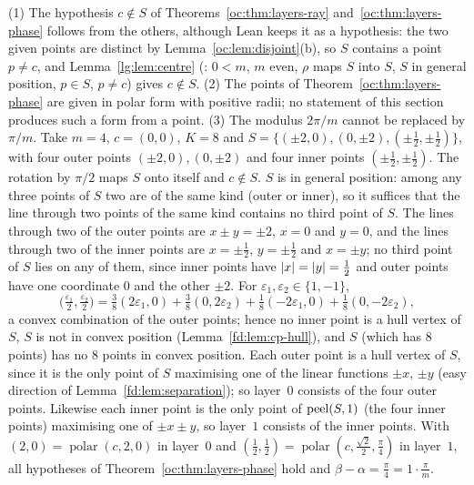 \begin{remark}\label{oc:rem:layers}
(1) The hypothesis $c\notin S$ of Theorems~\ref{oc:thm:layers-ray} and~\ref{oc:thm:layers-phase} follows
from the others, although Lean keeps it as a hypothesis: the two given points are distinct by
Lemma~\ref{oc:lem:disjoint}(b), so $S$ contains a point $p\ne c$, and Lemma~\ref{lg:lem:centre}
(: $0<m$, $m$ even, $\rho$ maps $S$ into $S$, $S$ in general position,
$p\in S$, $p\ne c$) gives $c\notin S$.
(2) The points of Theorem~\ref{oc:thm:layers-phase} are given in polar form with positive radii; no
statement of this section produces such a form from a point.
(3) The modulus $2\pi/m$ cannot be replaced by $\pi/m$. Take $m=4$, $c=(0,0)$, $K=8$ and
$S=\{(\pm2,0),(0,\pm2),(\pm\tfrac12,\pm\tfrac12)\}$, with four outer points $(\pm2,0),(0,\pm2)$ and four
inner points $(\pm\frac12,\pm\frac12)$. The rotation by $\pi/2$ maps $S$ onto itself and $c\notin S$.
$S$ is in general position: among any three points of $S$ two are of the same kind (outer or inner), so
it suffices that the line through two points of the same kind contains no third point of $S$. The lines
through two of the outer points are $x\pm y=\pm2$, $x=0$ and $y=0$, and the lines through two of the
inner points are $x=\pm\frac12$, $y=\pm\frac12$ and $x=\pm y$; no third point of $S$ lies on any of them,
since inner points have $\lvert x\rvert=\lvert y\rvert=\frac12$ and outer points have one coordinate $0$ and the other
$\pm2$. For $\varepsilon_1,\varepsilon_2\in\{1,-1\}$,
\[\bigl(\tfrac{\varepsilon_1}2,\tfrac{\varepsilon_2}2\bigr)=\tfrac38(2\varepsilon_1,0)+\tfrac38(0,2\varepsilon_2)
  +\tfrac18(-2\varepsilon_1,0)+\tfrac18(0,-2\varepsilon_2),\]
a convex combination of the outer points; hence no inner point is a hull vertex of $S$, $S$ is not in
convex position (Lemma~\ref{fd:lem:cp-hull}), and $S$ (which has $8$ points) has no $8$ points in convex
position. Each outer point is a hull vertex of $S$, since it is the only point of $S$
maximising one of the linear functions $\pm x$, $\pm y$ (easy direction of
Lemma~\ref{fd:lem:separation}); so layer~$0$ consists of the four outer points. Likewise each inner point
is the only point of $\operatorname{peel}(S,1)$ (the four inner points) maximising one of $\pm x\pm y$, so layer~$1$
consists of the inner points. With
$(2,0)=\operatorname{polar}(c,2,0)$ in layer~$0$ and
$(\frac12,\frac12)=\operatorname{polar}(c,\frac{\sqrt2}2,\frac\pi4)$ in layer~$1$, all hypotheses of
Theorem~\ref{oc:thm:layers-phase} hold and $\beta-\alpha=\frac\pi4=1\cdot\frac{\pi}{m}$.
\end{remark}

